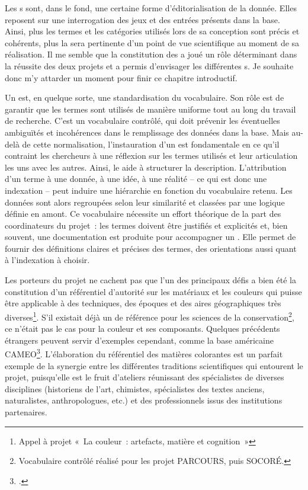 Les s sont, dans le fond, une certaine forme d’éditorialisation de la donnée. Elles reposent sur une interrogation des jeux et des entrées présents dans la base. Ainsi, plus les termes et les catégories utilisés lors de sa conception sont précis et cohérents, plus la  sera pertinente d’un point de vue scientifique au moment de sa réalisation. Il me semble que la constitution des  a joué un rôle déterminant dans la réussite des deux projets et a permis d’envisager les différentes s. Je souhaite donc m’y attarder un moment pour finir ce chapitre introductif. \par
Un  est, en quelque sorte, une standardisation du vocabulaire. Son rôle est de garantir que les termes sont utilisés de manière uniforme tout au long du travail de recherche. C’est un vocabulaire contrôlé, qui doit prévenir les éventuelles ambiguïtés et incohérences dans le remplissage des données dans la base. Mais au-delà de cette normalisation, l’instauration d’un  est fondamentale en ce qu’il contraint les chercheurs à une réflexion sur les termes utilisés et leur articulation les uns avec les autres. Ainsi, le  aide à structurer la description. L’attribution d’un terme à une donnée, à une idée, à une réalité – ce qui est donc une indexation – peut induire une hiérarchie en fonction du vocabulaire retenu. Les données sont alors regroupées selon leur similarité et classées par une logique définie en amont. Ce vocabulaire nécessite un effort théorique de la part des coordinateurs du projet~: les termes doivent être justifiés et explicités et, bien souvent, une documentation est produite pour accompagner un . Elle permet de fournir des définitions claires et précises des termes, des orientations aussi quant à l’indexation à choisir. \\\par
Les porteurs du projet ne cachent pas que l’un des principaux défis a bien été la constitution d’un référentiel d’autorité sur les matériaux et les couleurs qui puisse être applicable à des techniques, des époques et des aires géographiques très diverses\footnote{Appel à projet « La couleur~: artefacts, matière et cognition »}. S’il existait déjà un  de référence pour les sciences de la conservation\footnote{Vocabulaire contrôlé réalisé pour les projet PARCOURS, puis SOCORÉ.}, ce n’était pas le cas pour la couleur et ses composants. Quelques précédents étrangers peuvent servir d’exemples cependant, comme la base américaine CAMEO\footcite{conservation__art_materials_encyclopedia_online_pigment_nodate}. L’élaboration du référentiel des matières colorantes est un parfait exemple de la synergie entre les différentes traditions scientifiques qui entourent le projet, puisqu’elle est le fruit d’ateliers réunissant des spécialistes de diverses disciplines (historiens de l’art, chimistes, spécialistes des textes anciens, naturalistes, anthropologues, etc.) et des professionnels issus des institutions partenaires. 
